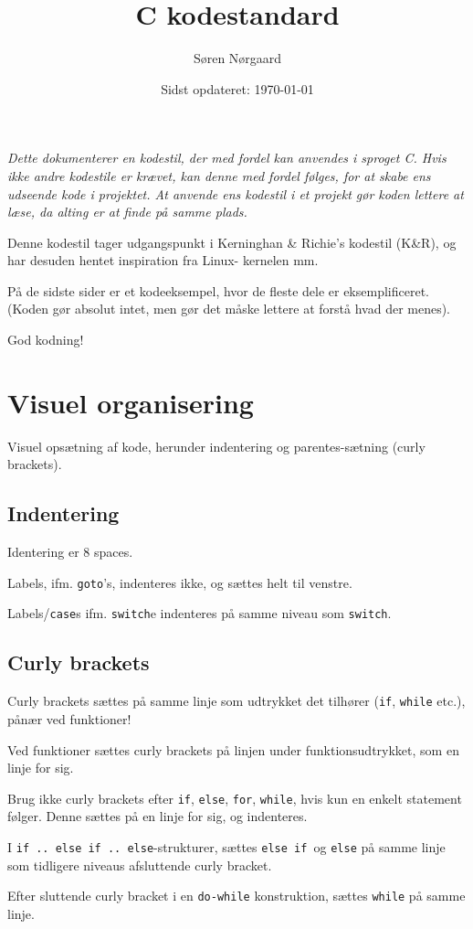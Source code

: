 \documentclass[article, 10pt]{memoir}
\title{C kodestandard}
\author{Søren Nørgaard}
\date{Sidst opdateret: \today}
\let\tempone\itemize
\let\temptwo\enditemize
\renewenvironment{itemize}{\tempone\firmlist}{\temptwo}
\begin{document}
\maketitle
\begin{multicols}{2}

    {
        \itshape
        Dette dokumenterer en kodestil, der med fordel kan anvendes i sproget C. Hvis ikke andre kodestile er krævet, kan denne med fordel følges, for at skabe ens udseende kode i projektet. At anvende ens kodestil i et projekt gør koden lettere at læse, da alting er at finde på samme plads.

        Denne kodestil tager udgangspunkt i Kerninghan \& Richie's kodestil (K\&R), og har desuden hentet inspiration fra Linux- kernelen mm.

        På de sidste sider er et kodeeksempel, hvor de fleste dele er eksemplificeret. (Koden gør absolut intet, men gør det måske lettere at forstå hvad der menes).

        God kodning!
    }
    \tableofcontents

    \chapter{Visuel organisering}
    Visuel opsætning af kode, herunder indentering og parentes-sætning (curly brackets).

    \section{Indentering}
    \begin{itemize}
    \item Identering er 8 spaces.
    \item Labels, ifm. \texttt{goto}'s, indenteres ikke, og sættes helt til venstre.
    \item Labels/\texttt{case}s ifm. \texttt{switch}e indenteres på samme niveau som \texttt{switch}.
    \end{itemize}

    \section{Curly brackets}
    \begin{itemize}
    \item Curly brackets sættes på samme linje som udtrykket det tilhører (\texttt{if}, \texttt{while} etc.), pånær ved funktioner!
    \item Ved funktioner sættes curly brackets på linjen under funktionsudtrykket, som en linje for sig.
    \item Brug ikke curly brackets efter \texttt{if}, \texttt{else}, \texttt{for}, \texttt{while}, hvis kun en enkelt statement følger. Denne sættes på en linje for sig, og indenteres.
    \item I \texttt{if .. else if .. else}-strukturer, sættes \texttt{else if }og \texttt{else} på samme linje som tidligere niveaus afsluttende curly bracket.
    \item Efter sluttende curly bracket i en \texttt{do-while} konstruktion, sættes \texttt{while} på samme linje.
    \end{itemize}


\end{multicols}
\end{document}

